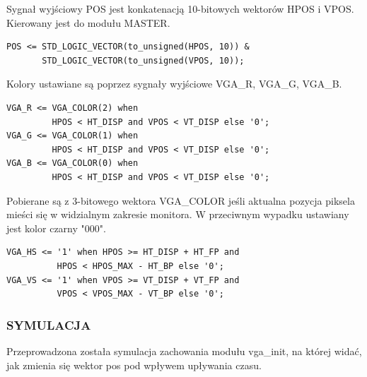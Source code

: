 \documentclass[11pt]{article}
\begin{document}
Sygnał wyjściowy POS jest konkatenacją 10-bitowych wektorów HPOS i VPOS. 
Kierowany jest do modułu MASTER.

\begin{lstlisting}[caption=Przypisanie wektora z pozycją piksela]
POS <= STD_LOGIC_VECTOR(to_unsigned(HPOS, 10)) &
       STD_LOGIC_VECTOR(to_unsigned(VPOS, 10));
\end{lstlisting}

Kolory ustawiane są poprzez sygnały wyjściowe VGA\_R, VGA\_G, VGA\_B.

\begin{lstlisting}[caption=Ustawienie kolorów]
VGA_R <= VGA_COLOR(2) when
         HPOS < HT_DISP and VPOS < VT_DISP else '0';
VGA_G <= VGA_COLOR(1) when
         HPOS < HT_DISP and VPOS < VT_DISP else '0';
VGA_B <= VGA_COLOR(0) when
         HPOS < HT_DISP and VPOS < VT_DISP else '0';
\end{lstlisting}

Pobierane są z 3-bitowego wektora VGA\_COLOR jeśli aktualna pozycja piksela mieści się w widzialnym zakresie monitora.
W przeciwnym wypadku ustawiany jest kolor czarny "000".

\begin{lstlisting}[caption=Sterowanie pozycją piksela]
VGA_HS <= '1' when HPOS >= HT_DISP + HT_FP and
          HPOS < HPOS_MAX - HT_BP else '0';
VGA_VS <= '1' when VPOS >= VT_DISP + VT_FP and
          VPOS < VPOS_MAX - VT_BP else '0';
\end{lstlisting}

\subsubsection{SYMULACJA}

Przeprowadzona została symulacja zachowania modułu vga\_init, na której widać, jak zmienia się wektor pos pod wpływem upływania czasu.
\end{document}

